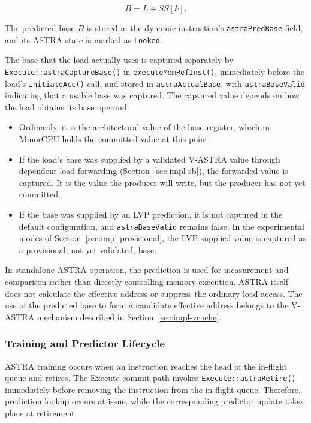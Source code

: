 \[
    B = L + SS[k].
\]

The predicted base \(B\) is stored in the dynamic instruction's
\texttt{astraPredBase} field, and its ASTRA state is marked as
\texttt{Looked}.

The base that the load actually uses is captured separately by
\texttt{Execute::\allowbreak astraCapture\allowbreak Base()} in
\texttt{executeMemRefInst()}, immediately before the load's
\texttt{initiateAcc()} call, and stored in \texttt{astraActualBase},
with \texttt{astraBaseValid} indicating that a usable base was
captured. The captured value depends on how the load obtains its base
operand:

\begin{itemize}
    \item Ordinarily, it is the architectural value of the base
    register, which in MinorCPU holds the committed value at this
    point.

    \item If the load's base was supplied by a validated V-ASTRA value
    through dependent-load forwarding (Section~\ref{sec:impl-sb}), the
    forwarded value is captured. It is the value the producer will
    write, but the producer has not yet committed.

    \item If the base was supplied by an LVP prediction, it is not
    captured in the default configuration, and
    \texttt{astraBaseValid} remains false. In the experimental modes of
    Section~\ref{sec:impl-provisional}, the LVP-supplied value is
    captured as a provisional, not yet validated, base.
\end{itemize}

In standalone ASTRA operation, the prediction is used for
measurement and comparison rather than directly controlling
memory execution. ASTRA itself does not calculate the effective
address or suppress the ordinary load access. The use of the
predicted base to form a candidate effective address belongs
to the V-ASTRA mechanism described in Section~\ref{sec:impl-vcache}.

\subsubsection{Training and Predictor Lifecycle}

ASTRA training occurs when an instruction reaches the head of
the in-flight queue and retires. The Execute commit path invokes
\texttt{Execute::astraRetire()} immediately before removing
the instruction from the in-flight queue. Therefore, prediction
lookup occurs at issue, while the corresponding predictor update
takes place at retirement.

